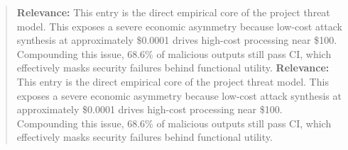 \documentclass[11pt, a4paper]{article}
\begin{document}
\begin{quote}
\vspace{0.5em}
\textbf{Relevance:} This entry is the direct empirical core of the project threat model. This exposes a severe economic asymmetry because low-cost attack synthesis at approximately \$0.0001 drives high-cost processing near \$100. Compounding this issue, 68.6\% of malicious outputs still pass CI, which effectively masks security failures behind functional utility.
\textbf{Relevance:} This entry is the direct empirical core of the project threat model. This exposes a severe economic asymmetry because low-cost attack synthesis at approximately \$0.0001 drives high-cost processing near \$100. Compounding this issue, 68.6\% of malicious outputs still pass CI, which effectively masks security failures behind functional utility.
\end{quote}
\end{document}
